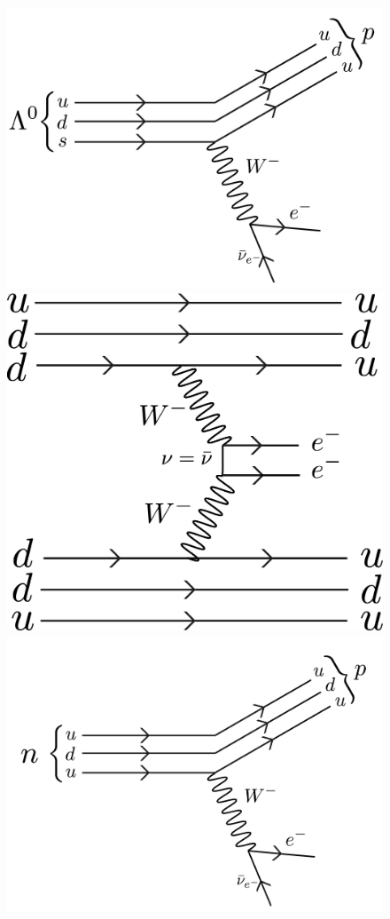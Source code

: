 \begin{figure}[hbtp]
    \includegraphics[scale=0.05]{Feynman/lambda0-01.jpg}
    \includegraphics[scale=0.2]{Feynman/neutrinoless.jpg}
    \includegraphics[scale=0.05]{Feynman/worldwouldbeboring-01.jpg}
\end{figure}

